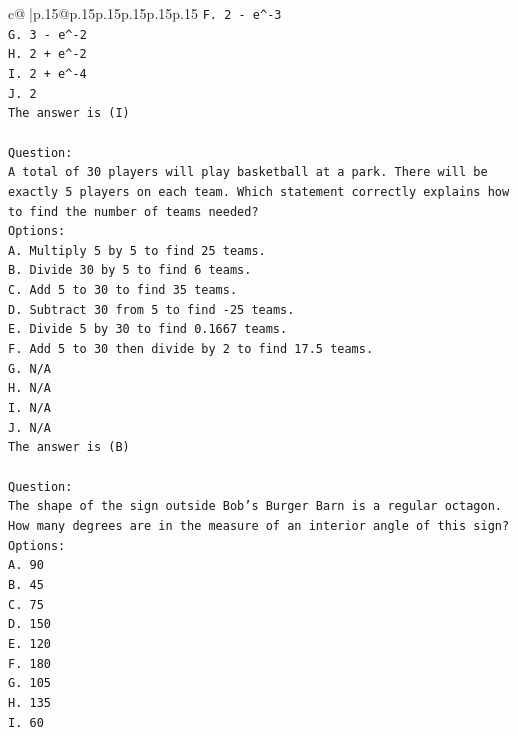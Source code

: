 \documentclass{article}
\begin{document}
{\begin{supertabular}{c@{$\;$}|p{.15\linewidth}@{}p{.15\linewidth}p{.15\linewidth}p{.15\linewidth}p{.15\linewidth}p{.15\linewidth}}
{{{\texttt{F. 2 {-} e\^{}{-}3} \\
\texttt{G. 3 {-} e\^{}{-}2} \\
\texttt{H. 2 + e\^{}{-}2} \\
\texttt{I. 2 + e\^{}{-}4} \\
\texttt{J. 2} \\
\texttt{The answer is (I)} \\
\\ 
\texttt{Question:} \\
\texttt{A total of 30 players will play basketball at a park. There will be exactly 5 players on each team. Which statement correctly explains how to find the number of teams needed?} \\
\texttt{Options:} \\
\texttt{A. Multiply 5 by 5 to find 25 teams.} \\
\texttt{B. Divide 30 by 5 to find 6 teams.} \\
\texttt{C. Add 5 to 30 to find 35 teams.} \\
\texttt{D. Subtract 30 from 5 to find {-}25 teams.} \\
\texttt{E. Divide 5 by 30 to find 0.1667 teams.} \\
\texttt{F. Add 5 to 30 then divide by 2 to find 17.5 teams.} \\
\texttt{G. N/A} \\
\texttt{H. N/A} \\
\texttt{I. N/A} \\
\texttt{J. N/A} \\
\texttt{The answer is (B)} \\
\\ 
\texttt{Question:} \\
\texttt{The shape of the sign outside Bob's Burger Barn is a regular octagon. How many degrees are in the measure of an interior angle of this sign?} \\
\texttt{Options:} \\
\texttt{A. 90} \\
\texttt{B. 45} \\
\texttt{C. 75} \\
\texttt{D. 150} \\
\texttt{E. 120} \\
\texttt{F. 180} \\
\texttt{G. 105} \\
\texttt{H. 135} \\
\texttt{I. 60} \\
            }
        }
    }
     \\ \\


\end{supertabular}}
\end{document}
